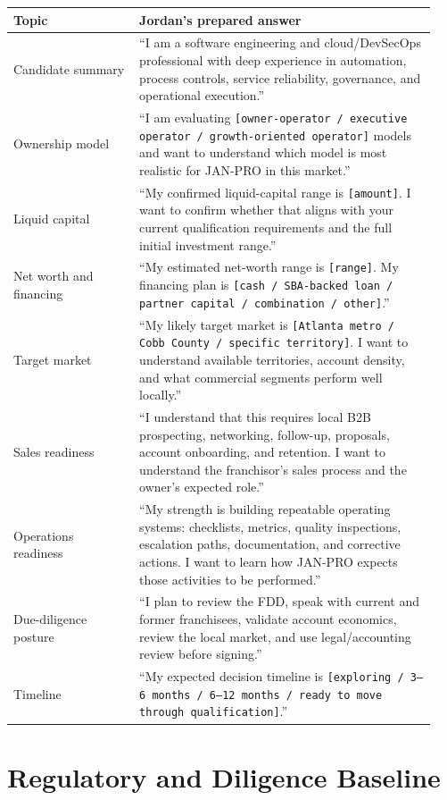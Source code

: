 \documentclass[11pt]{article}
\newcommand{\placeholder}[1]{\textcolor{accent}{\texttt{[#1]}}}
\newcommand{\janpro}{JAN-PRO}
\begin{document}
\begin{longtable}{>{\raggedright\arraybackslash}p{0.28\linewidth}>{\raggedright\arraybackslash}p{0.66\linewidth}}
\toprule
\textbf{Topic} & \textbf{Jordan's prepared answer} \\
\midrule
Candidate summary & ``I am a software engineering and cloud/DevSecOps professional with deep experience in automation, process controls, service reliability, governance, and operational execution.'' \\
Ownership model & ``I am evaluating \placeholder{owner-operator / executive operator / growth-oriented operator} models and want to understand which model is most realistic for \janpro{} in this market.'' \\
Liquid capital & ``My confirmed liquid-capital range is \placeholder{amount}. I want to confirm whether that aligns with your current qualification requirements and the full initial investment range.'' \\
Net worth and financing & ``My estimated net-worth range is \placeholder{range}. My financing plan is \placeholder{cash / SBA-backed loan / partner capital / combination / other}.'' \\
Target market & ``My likely target market is \placeholder{Atlanta metro / Cobb County / specific territory}. I want to understand available territories, account density, and what commercial segments perform well locally.'' \\
Sales readiness & ``I understand that this requires local B2B prospecting, networking, follow-up, proposals, account onboarding, and retention. I want to understand the franchisor's sales process and the owner's expected role.'' \\
Operations readiness & ``My strength is building repeatable operating systems: checklists, metrics, quality inspections, escalation paths, documentation, and corrective actions. I want to learn how \janpro{} expects those activities to be performed.'' \\
Due-diligence posture & ``I plan to review the FDD, speak with current and former franchisees, validate account economics, review the local market, and use legal/accounting review before signing.'' \\
Timeline & ``My expected decision timeline is \placeholder{exploring / 3--6 months / 6--12 months / ready to move through qualification}.'' \\
\bottomrule
\end{longtable}

\section{Regulatory and Diligence Baseline}
\end{document}
